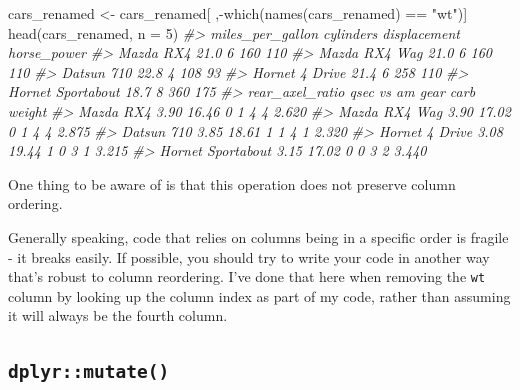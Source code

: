 \documentclass[
  12pt,
]{book}
\newenvironment{Shaded}{\begin{snugshade}}{\end{snugshade}}
\newcommand{\AttributeTok}[1]{\textcolor[rgb]{0.77,0.63,0.00}{#1}}
\newcommand{\CommentTok}[1]{\textcolor[rgb]{0.56,0.35,0.01}{\textit{#1}}}
\newcommand{\DecValTok}[1]{\textcolor[rgb]{0.00,0.00,0.81}{#1}}
\newcommand{\FunctionTok}[1]{\textcolor[rgb]{0.00,0.00,0.00}{#1}}
\newcommand{\NormalTok}[1]{#1}
\newcommand{\OtherTok}[1]{\textcolor[rgb]{0.56,0.35,0.01}{#1}}
\newcommand{\SpecialCharTok}[1]{\textcolor[rgb]{0.00,0.00,0.00}{#1}}
\newcommand{\StringTok}[1]{\textcolor[rgb]{0.31,0.60,0.02}{#1}}
\begin{document}
\begin{Shaded}
\begin{Highlighting}[]
\NormalTok{cars\_renamed }\OtherTok{\textless{}{-}}\NormalTok{ cars\_renamed[ ,}\SpecialCharTok{{-}}\FunctionTok{which}\NormalTok{(}\FunctionTok{names}\NormalTok{(cars\_renamed) }\SpecialCharTok{==} \StringTok{"wt"}\NormalTok{)]}
\FunctionTok{head}\NormalTok{(cars\_renamed, }\AttributeTok{n =} \DecValTok{5}\NormalTok{)}
\CommentTok{\#\textgreater{}                   miles\_per\_gallon cylinders displacement horse\_power}
\CommentTok{\#\textgreater{} Mazda RX4                     21.0         6          160         110}
\CommentTok{\#\textgreater{} Mazda RX4 Wag                 21.0         6          160         110}
\CommentTok{\#\textgreater{} Datsun 710                    22.8         4          108          93}
\CommentTok{\#\textgreater{} Hornet 4 Drive                21.4         6          258         110}
\CommentTok{\#\textgreater{} Hornet Sportabout             18.7         8          360         175}
\CommentTok{\#\textgreater{}                   rear\_axel\_ratio  qsec vs am gear carb weight}
\CommentTok{\#\textgreater{} Mazda RX4                    3.90 16.46  0  1    4    4  2.620}
\CommentTok{\#\textgreater{} Mazda RX4 Wag                3.90 17.02  0  1    4    4  2.875}
\CommentTok{\#\textgreater{} Datsun 710                   3.85 18.61  1  1    4    1  2.320}
\CommentTok{\#\textgreater{} Hornet 4 Drive               3.08 19.44  1  0    3    1  3.215}
\CommentTok{\#\textgreater{} Hornet Sportabout            3.15 17.02  0  0    3    2  3.440}
\end{Highlighting}
\end{Shaded}

One thing to be aware of is that this operation does not preserve column ordering.

Generally speaking, code that relies on columns being in a specific order is fragile - it breaks easily. If possible, you should try to write your code in another way that's robust to column reordering. I've done that here when removing the \texttt{wt} column by looking up the column index as part of my code, rather than assuming it will always be the fourth column.

\hypertarget{dplyrmutate}{%
\subsection{\texorpdfstring{\texttt{dplyr::mutate()}}{dplyr::mutate()}}\label{dplyrmutate}}
\end{document}
